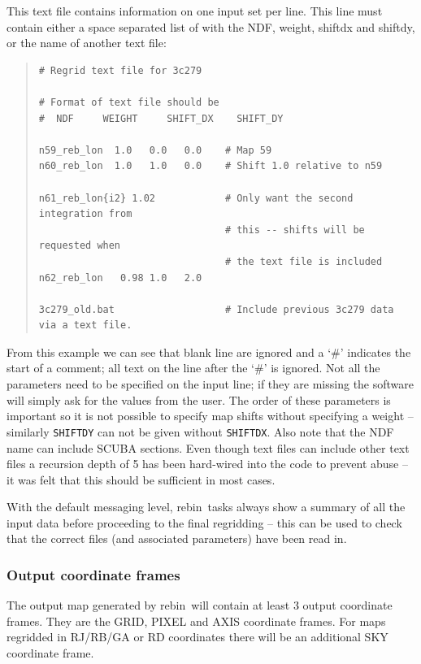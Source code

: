 \documentclass[twoside,11pt]{article}
\newcommand{\task}[1]{{\sf #1}}
\newcommand{\param}[1]{{\tt #1}}
\newcommand{\rebin}{\htmlref{\task{rebin}}{REBIN}}
\newenvironment{myquote}{\begin{quote}\begin{small}}{\end{small}\end{quote}}
\newcommand{\htmlref}[2]{#1}
\renewcommand{\_}{\texttt{\symbol{95}}}
\begin{document}
This text file contains information on one input set per line. This line
must contain either a space separated list of with the NDF, weight, shift\_dx
and shift\_dy, or the name of another text file:

\begin{myquote}
\begin{verbatim}
# Regrid text file for 3c279

# Format of text file should be
#  NDF     WEIGHT     SHIFT_DX    SHIFT_DY

n59_reb_lon  1.0   0.0   0.0    # Map 59
n60_reb_lon  1.0   1.0   0.0    # Shift 1.0 relative to n59

n61_reb_lon{i2} 1.02            # Only want the second integration from
                                # this -- shifts will be requested when
                                # the text file is included
n62_reb_lon   0.98 1.0   2.0    

3c279_old.bat                   # Include previous 3c279 data via a text file.
\end{verbatim}
\end{myquote}

From this example we can see that blank line are ignored and a `\#' indicates
the start of a comment; all text on the line after the `\#' is ignored. Not
all the parameters need to be specified on the input line; if they are missing
the software will simply ask for the values from the user. The order of these
parameters is important so it is not possible to specify map shifts without
specifying a weight -- similarly \param{SHIFT\_DY} can not be given without
\param{SHIFT\_DX}. Also note that the NDF name can include SCUBA sections.
Even though text files can include other text files a recursion depth of 5 has
been hard-wired into the code to prevent abuse -- it was felt that this should
be sufficient in most cases.

With the default messaging level, \rebin\ tasks always show a summary
of all the input data before proceeding to the final regridding -- this
can be used to check that the correct files (and associated parameters) 
have been read in.

\subsubsection{Output coordinate frames}

The output map generated by \rebin\ will contain at least 3 output
coordinate frames. They are the GRID, PIXEL and AXIS coordinate
frames. For maps regridded in RJ/RB/GA or RD coordinates there will be an
additional SKY coordinate frame.
\end{document}
